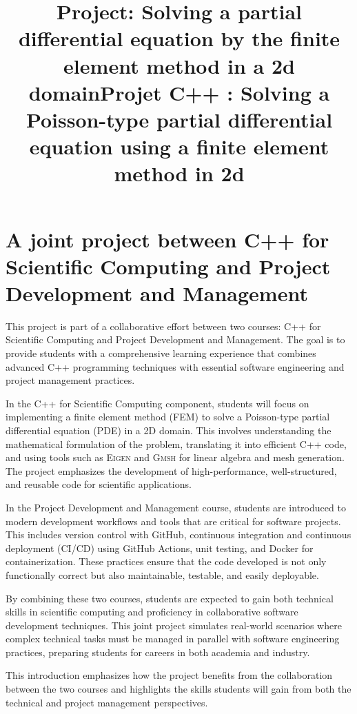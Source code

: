\documentclass[english,10pt,a4paper]{article}
\title{Project: Solving a partial differential equation by the finite element method in a 2d domain}
\title{Projet C++ : Solving a Poisson-type partial differential equation using a finite element method in 2d}
\date{}
\begin{document}
\maketitle
\tableofcontents


\section*{A joint project between C++ for Scientific Computing and Project Development and Management}

This project is part of a collaborative effort between two courses: C++ for Scientific Computing and Project Development and Management. The goal is to provide students with a comprehensive learning experience that combines advanced C++ programming techniques with essential software engineering and project management practices.

In the C++ for Scientific Computing component, students will focus on implementing a finite element method (FEM) to solve a Poisson-type partial differential equation (PDE) in a 2D domain. This involves understanding the mathematical formulation of the problem, translating it into efficient C++ code, and using tools such as \textsc{Eigen} and \textsc{Gmsh} for linear algebra and mesh generation. The project emphasizes the development of high-performance, well-structured, and reusable code for scientific applications.

In the Project Development and Management course, students are introduced to modern development workflows and tools that are critical for software projects. This includes version control with GitHub, continuous integration and continuous deployment (CI/CD) using GitHub Actions, unit testing, and Docker for containerization. These practices ensure that the code developed is not only functionally correct but also maintainable, testable, and easily deployable.

By combining these two courses, students are expected to gain both technical skills in scientific computing and proficiency in collaborative software development techniques. This joint project simulates real-world scenarios where complex technical tasks must be managed in parallel with software engineering practices, preparing students for careers in both academia and industry.

This introduction emphasizes how the project benefits from the collaboration between the two courses and highlights the skills students will gain from both the technical and project management perspectives.
\end{document}
